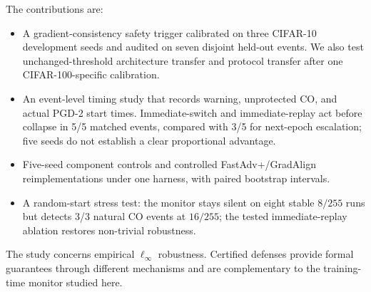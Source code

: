 The contributions are:
\begin{itemize}
    \item A gradient-consistency safety trigger calibrated on three CIFAR-10
    development seeds and audited on seven disjoint held-out events. We also
    test unchanged-threshold architecture transfer and protocol transfer after
    one CIFAR-100-specific calibration.
    \item An event-level timing study that records warning, unprotected CO,
    and actual PGD-2 start times. Immediate-switch and immediate-replay act
    before collapse in 5/5 matched events, compared with 3/5 for next-epoch
    escalation; five seeds do not establish a clear proportional advantage.
    \item Five-seed component controls and controlled FastAdv+/GradAlign
    reimplementations under one harness, with paired bootstrap intervals.
    \item A random-start stress test: the monitor stays silent on eight stable
    $8/255$ runs but detects 3/3 natural CO events at $16/255$; the tested
    immediate-replay ablation restores non-trivial robustness.
\end{itemize}

The study concerns empirical $\ell_\infty$ robustness. Certified defenses
provide formal guarantees through different mechanisms and are complementary
to the training-time monitor studied here.
